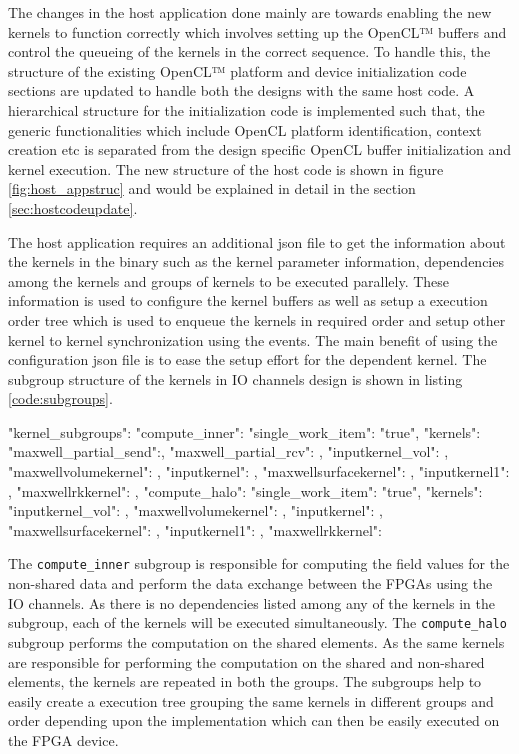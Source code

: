The changes in the host application done mainly are towards enabling the new kernels to function correctly
which involves setting up the OpenCL™ buffers and control the queueing of the kernels in the correct sequence.
To handle this, the structure of the existing OpenCL™ platform and device initialization code sections are
updated to handle both the designs with the same host code. A hierarchical structure for the initialization code
is implemented such that, the generic functionalities which include OpenCL platform identification,
context creation etc is separated from the design specific OpenCL buffer
initialization and kernel execution. The new structure of the host code is shown
in figure \ref{fig:host_appstruc} and would be explained in detail in the section \ref{sec:hostcodeupdate}.

The host application requires an additional json file to get the information about the kernels in the binary such as
the kernel parameter information, dependencies among the kernels and groups of kernels to be executed parallely.
These information is used to configure the kernel buffers as well as setup a execution order tree which is used
to enqueue the kernels in required order and setup other kernel to kernel synchronization using the events.
The main benefit of using the configuration json file is to ease the setup effort for the dependent kernel.
The subgroup structure of the kernels in IO channels design is shown in listing \ref{code:subgroups}.

\begin{JsonCode}[caption=Kernel subgroups used in Multi FPGA design to enqueue kernels, frame=tlrb, label=code:subgroups]
"kernel_subgroups":
{
    "compute_inner":
    {
        "single_work_item": "true",
        "kernels":
        {
            "maxwell_partial_send":{},
            "maxwell_partial_rcv": {},
            "inputkernel_vol": {},
            "maxwellvolumekernel": {},
            "inputkernel": {},
            "maxwellsurfacekernel": {},
            "inputkernel1": {},
            "maxwellrkkernel": {}
        }
    },
    "compute_halo":
    {
        "single_work_item": "true",
        "kernels":
        {
            "inputkernel_vol": {},
            "maxwellvolumekernel": {},
            "inputkernel": {},
            "maxwellsurfacekernel": {},
            "inputkernel1": {},
            "maxwellrkkernel": {}
        }
    }
}
\end{JsonCode}

The \texttt{compute\_inner} subgroup is responsible for computing the field values for the non-shared
data and perform the data exchange between the FPGAs using the IO channels. As there is no dependencies
listed among any of the kernels in the subgroup, each of the kernels will be executed simultaneously.
The \texttt{compute\_halo} subgroup performs the computation on the shared elements. As the same kernels
are responsible for performing the computation on the shared and non-shared elements, the kernels are
repeated in both the groups. The subgroups help to easily create a execution tree grouping
the same kernels in different groups and order depending upon the implementation which can then be
easily executed on the FPGA device.

